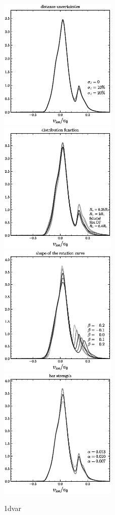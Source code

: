 \documentclass[12pt,preprint]{aastex}
\begin{document}
\clearpage
\begin{figure}
\includegraphics[width=0.5\textwidth]{distuncertain.ps}
\includegraphics[width=0.5\textwidth]{df.ps}\\
\includegraphics[width=0.5\textwidth]{slope.ps}
\includegraphics[width=0.5\textwidth]{barstrength.ps}
\caption{1dvar}\label{fig:1dvar}
\end{figure}
\end{document}
